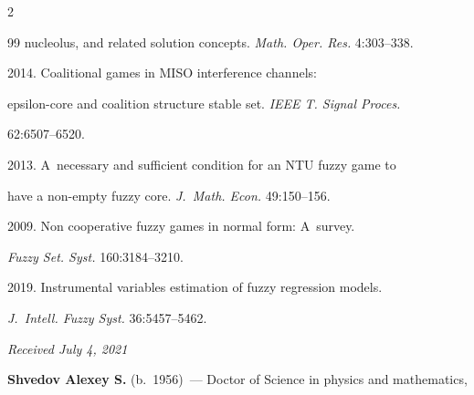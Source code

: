 \begin{multicols}{2}
{{\begin{thebibliography}{99}
nucleolus, and related solution concepts. \textit{Math. Oper. Res.} 4:303--338.


 2014. Coalitional games in MISO interference channels: 

epsilon-core and coalition structure stable set. \textit{IEEE T. Signal Proces.}  

62:6507--6520.


 2013. A~necessary and sufficient condition for an NTU fuzzy game to 

have a non-empty fuzzy core. \textit{J.~Math. Econ.} 49:150--156.


       2009. Non cooperative fuzzy games in normal form: A~survey. 

\textit{Fuzzy Set. Syst.} 160:3184--3210.


 2019. Instrumental variables estimation of fuzzy regression models. 

\textit{J.~Intell. Fuzzy Syst.} 36:5457--5462.



 \end{thebibliography}



 }

 }



\end{multicols}



\vspace*{-9pt}



\hfill{\small\textit{Received July 4, 2021}}    



\vspace*{-18pt}



\Contrl



\vspace*{-3pt}



\noindent

\textbf{Shvedov Alexey S.} (b.\ 1956)~--- Doctor of Science in physics and mathematics, 

